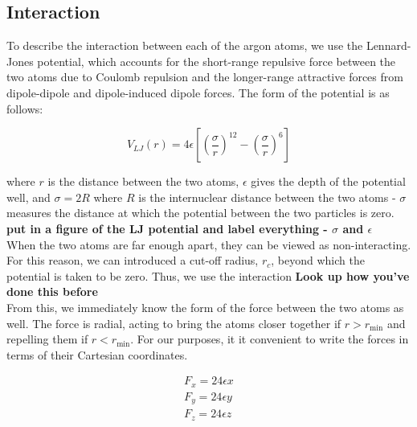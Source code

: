 \documentclass{article}
\begin{document}
\begin{multicols}{2}
\subsection{Interaction}

To describe the interaction between each of the argon atoms, we use the Lennard-Jones potential, which accounts for the short-range repulsive force between the two atoms due to Coulomb repulsion and the longer-range attractive forces from dipole-dipole and dipole-induced dipole forces.  The form of the potential is as follows:

\begin{equation}
V_{LJ}(r) = 4 \epsilon \left [ \left (\frac{\sigma}{r} \right )^{12} - \left (\frac{\sigma}{r} \right )^{6} \right ]
\end{equation}

\noindent where $r$ is the distance between the two atoms, $\epsilon$ gives the depth of the potential well, and $\sigma = 2R $ where $R$ is the internuclear distance between the two atoms - $\sigma$ measures the distance at which the potential between the two particles is zero.  \\

\textbf{put in a figure of the LJ potential and label everything - $\sigma$ and $\epsilon$} \\

When the two atoms are far enough apart, they can be viewed as non-interacting.  For this reason, we can introduced a cut-off radius, $r_c$, beyond which the potential is taken to be zero.  Thus, we use the interaction \textbf{Look up how you've done this before} \\


From this, we immediately know the form of the force between the two atoms as well.  The force is radial, acting to bring the atoms closer together if $r > r_{\mathrm{min}}$ and repelling them if $r < r_{\mathrm{min}}$.  For our purposes, it it convenient to write the forces in terms of their Cartesian coordinates.  

\begin{equation}
\begin{split}
F_x = 24\epsilon x \\
F_y = 24 \epsilon y\\
F_z = 24 \epsilon z \\
\end{split}
\end{equation}


\end{multicols}
\end{document}
